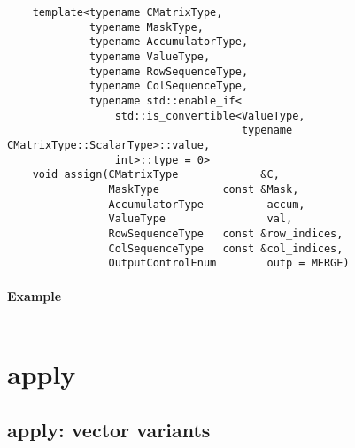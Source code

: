 \begin{verbatim}
    template<typename CMatrixType,
             typename MaskType,
             typename AccumulatorType,
             typename ValueType,
             typename RowSequenceType,
             typename ColSequenceType,
             typename std::enable_if<
                 std::is_convertible<ValueType,
                                     typename CMatrixType::ScalarType>::value,
                 int>::type = 0>
    void assign(CMatrixType             &C,
                MaskType          const &Mask,
                AccumulatorType          accum,
                ValueType                val,
                RowSequenceType   const &row_indices,
                ColSequenceType   const &col_indices,
                OutputControlEnum        outp = MERGE)
\end{verbatim}


\paragraph{Example}

\begin{verbatim}

\end{verbatim}



\section{{\sf apply}}


\subsection{{\sf apply}: vector variants}

\paragraph{\syntax}

